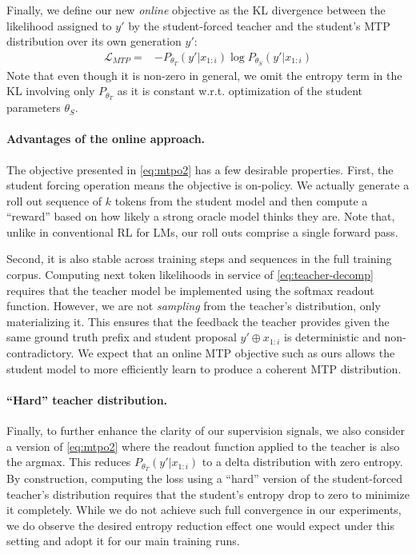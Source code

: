 \documentclass{article}
\theoremstyle{plain}
\theoremstyle{definition}
\theoremstyle{remark}
\begin{document}
Finally, we define our new \textit{online} objective as the KL divergence between the likelihood assigned to $y'$ by the student-forced teacher and the student's MTP distribution over its own generation $y'$:
\begin{align}\label{eq:mtpo2}
\mathcal{L}_{MTP} = &- P_{\theta_T}(y' | x_{1:i}) \log P_{\theta_S}(y' | x_{1:i})
\end{align}
Note that even though it is non-zero in general, we omit the entropy term in the KL involving only $P_{\theta_T}$ as it is constant w.r.t. optimization of the student parameters $\theta_S$.

\paragraph{Advantages of the online approach.}
The objective presented in \cref{eq:mtpo2} has a few desirable properties. First, the student forcing operation means the objective is on-policy. We actually generate a roll out sequence of $k$ tokens from the student model and then compute a ``reward'' based on how likely a strong oracle model thinks they are. Note that, unlike in conventional RL for LMs, our roll outs comprise a single forward pass.

Second, it is also stable across training steps and sequences in the full training corpus. Computing next token likelihoods in service of \cref{eq:teacher-decomp} requires that the teacher model be implemented using the softmax readout function. However, we are not \textit{sampling} from the teacher's distribution, only materializing it. This ensures that the feedback the teacher provides given the same ground truth prefix and student proposal $y' \oplus x_{1:i}$ is deterministic and non-contradictory. 
We expect that an online MTP objective such as ours allows the student model to more efficiently learn to produce a coherent MTP distribution.

\paragraph{``Hard'' teacher distribution.}
Finally, to further enhance the clarity of our supervision signals, we also consider a version of \cref{eq:mtpo2} where the readout function applied to the teacher is also the argmax. This reduces $P_{\theta_T}(y'| x_{1:i})$ to a delta distribution with zero entropy. By construction, computing the loss using a ``hard'' version of the student-forced teacher's distribution requires that the student's entropy drop to zero to minimize it completely. While we do not achieve such full convergence in our experiments, we do observe the desired entropy reduction effect one would expect under this setting and adopt it for our main training runs.
\end{document}
